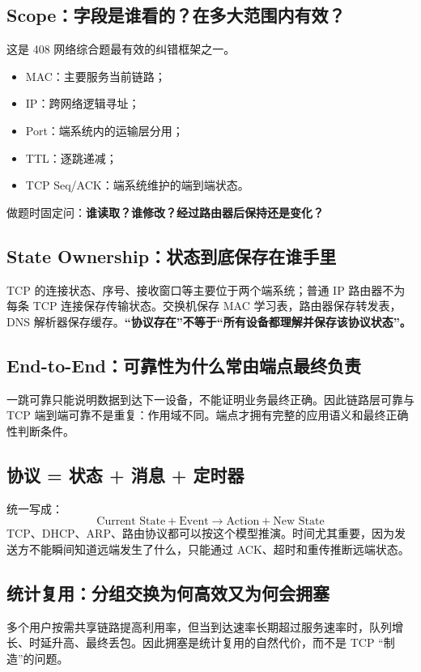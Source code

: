 \documentclass[11pt,a4paper,openany]{ctexbook}
\newcommand{\key}[1]{\textbf{\color{deep}#1}}
\begin{document}
\subsection{Scope：字段是谁看的？在多大范围内有效？}
这是 408 网络综合题最有效的纠错框架之一。
\begin{itemize}
  \item MAC：主要服务当前链路；
  \item IP：跨网络逻辑寻址；
  \item Port：端系统内的运输层分用；
  \item TTL：逐跳递减；
  \item TCP Seq/ACK：端系统维护的端到端状态。
\end{itemize}
做题时固定问：\key{谁读取？谁修改？经过路由器后保持还是变化？}

\subsection{State Ownership：状态到底保存在谁手里}
TCP 的连接状态、序号、接收窗口等主要位于两个端系统；普通 IP 路由器不为每条 TCP 连接保存传输状态。交换机保存 MAC 学习表，路由器保存转发表，DNS 解析器保存缓存。\textbf{“协议存在”不等于“所有设备都理解并保存该协议状态”。}

\subsection{End-to-End：可靠性为什么常由端点最终负责}
一跳可靠只能说明数据到达下一设备，不能证明业务最终正确。因此链路层可靠与 TCP 端到端可靠不是重复：作用域不同。端点才拥有完整的应用语义和最终正确性判断条件。

\subsection{协议 = 状态 + 消息 + 定时器}
统一写成：
\[
\boxed{\text{Current State}+\text{Event}\rightarrow\text{Action}+\text{New State}}
\]
TCP、DHCP、ARP、路由协议都可以按这个模型推演。时间尤其重要，因为发送方不能瞬间知道远端发生了什么，只能通过 ACK、超时和重传推断远端状态。

\subsection{统计复用：分组交换为何高效又为何会拥塞}
多个用户按需共享链路提高利用率，但当到达速率长期超过服务速率时，队列增长、时延升高、最终丢包。因此拥塞是统计复用的自然代价，而不是 TCP “制造”的问题。
\end{document}
